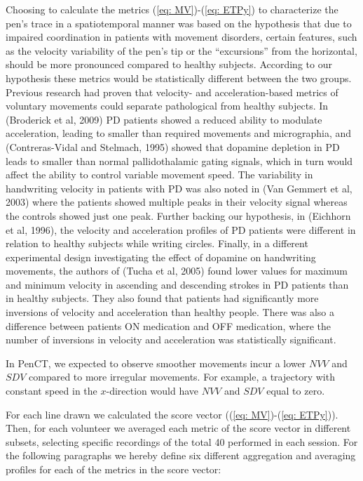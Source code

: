 Choosing to calculate the metrics (\ref{eq: MV})-(\ref{eq: ETPy}) to characterize the pen's trace in a spatiotemporal manner was based on the hypothesis that due to impaired coordination in patients with movement disorders, certain features, such as the velocity variability of the pen's tip or the ``excursions'' from the horizontal, should be more pronounced compared to healthy subjects. According to our hypothesis these metrics would be statistically different between the two groups. Previous research had proven that velocity- and acceleration-based metrics of voluntary movements could separate pathological from healthy subjects. In (Broderick et al, 2009) \gls{PD} patients showed a reduced ability to modulate acceleration, leading to smaller than required movements and micrographia, and (Contreras-Vidal and Stelmach, 1995) showed  that dopamine depletion in \gls{PD} leads to smaller than normal pallidothalamic gating signals, which in turn would affect the ability to control variable movement speed. The variability in handwriting velocity in patients with \gls{PD} was also noted in (Van Gemmert et al, 2003) where the patients showed multiple peaks in their velocity signal whereas the controls showed just one peak. Further backing our hypothesis, in (Eichhorn et al, 1996), the velocity and acceleration profiles of \gls{PD} patients were different in relation to healthy subjects while writing circles. Finally, in a different experimental design investigating the effect of dopamine on handwriting movements, the authors of (Tucha et al, 2005) found lower values for maximum and minimum velocity in ascending and descending strokes in \gls{PD} patients than in healthy subjects. They also found that patients had significantly more inversions of velocity and acceleration than healthy people. There was also a difference between patients ON medication and OFF medication, where the number of inversions in velocity and acceleration was statistically significant. 

In \gls{PenCT}, we expected to observe smoother movements incur a lower $NVV$ and $SDV$ compared to more irregular movements. For example, a trajectory with constant speed in the $x$-direction would have $NVV$ and $SDV$ equal to zero.

For each line drawn we calculated the score vector ((\ref{eq: MV})-(\ref{eq: ETPy})). Then, for each volunteer we averaged each metric of the score vector in different subsets, selecting specific recordings of the total 40 performed in each session. 
For the following paragraphs we hereby define six different aggregation and averaging profiles for each of the metrics in the score vector: 

